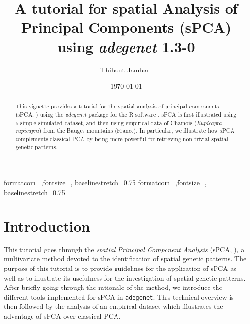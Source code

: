 \documentclass{article}
\title{A tutorial for spatial Analysis of Principal Components (sPCA) using \textit{adegenet} 1.3-0}
\author{Thibaut Jombart}
\date{\today}
\begin{document}
{formatcom={\color{Sinput}},fontsize=\footnotesize, baselinestretch=0.75}
{formatcom={\color{Soutput}},fontsize=\footnotesize, baselinestretch=0.75}

\color{black}

\maketitle

\begin{abstract}
  This vignette provides a tutorial for the spatial analysis of principal components (sPCA, \cite{tjart04}) using
  the \textit{adegenet} package \cite{tjart05} for the R software \cite{np145}. sPCA is first
  illustrated using a simple simulated dataset, and then using empirical data of Chamois
  (\textit{Rupicapra rupicapra}) from the Bauges mountains (France). In particular, we illustrate
  how sPCA complements classical PCA by being more powerful for retrieving non-trivial spatial genetic patterns.
\end{abstract}


\newpage
\tableofcontents




\newpage
\section{Introduction}

This tutorial goes through the \emph{spatial Principal Component
  Analysis} (sPCA, \cite{tjart04}), a multivariate method devoted to
the identification of spatial genetic patterns.
The purpose of this tutorial is to provide guidelines for the application of sPCA as well as to
illustrate its usefulness for the investigation of spatial genetic patterns.
After briefly going through the rationale of the method, we introduce the different tools
implemented for sPCA in \texttt{adegenet}.
This technical overview is then followed by the analysis of an empirical dataset which illustrates
the advantage of sPCA over classical PCA.




\end{document}
